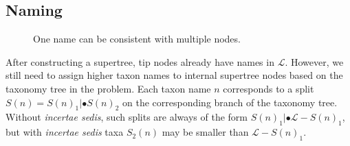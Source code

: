 \documentclass[english]{article}
\begin{document}
\subsection{Naming }

\begin{figure}
\hfill{}
\hfill{}
\hfill{}
\caption{\label{fig:One-name-can}One name can be consistent with multiple nodes.}
\end{figure}

After constructing a supertree, tip nodes already have names in \emph{$\mathcal{L}$}.
However, we still need to assign higher taxon names to internal supertree nodes
based on the taxonomy tree in the problem. Each taxon name $n$ corresponds to a
split $S(n)=S(n)_{1}|\bullet S(n)_{2}$ on the corresponding branch of the taxonomy tree. Without
\emph{incertae sedis}, such splits are always of the form $S(n)_{1}|\bullet\mathcal{L}-S(n)_{1}$, but
with \emph{incertae sedis} taxa $S_{2}(n)$ may be smaller than $\mathcal{L}-S(n)_{1}$.
\end{document}
